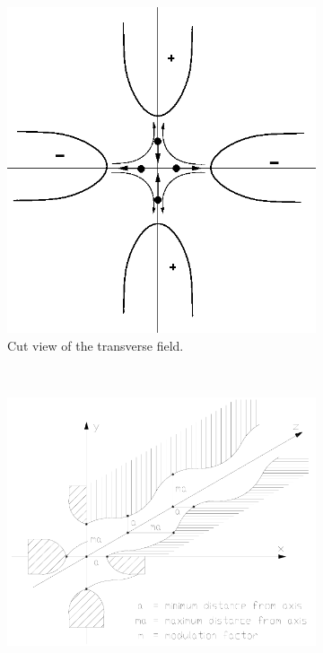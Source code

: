 \begin{figure}[!ht]
	\centering
		\begin{subfigure}[t]{.3\textwidth}
			\includegraphics[width=\textwidth]{02_BeamDiag/figures/fig000_RFQ_a}
			\caption{Cut view of the transverse field.}
			\label{}
		\end{subfigure}
  ~
	\begin{subfigure}[t]{0.3\textwidth}
    \includegraphics[width=\textwidth]{02_BeamDiag/figures/fig000_RFQ_b}

\end{subfigure}
\end{figure}
